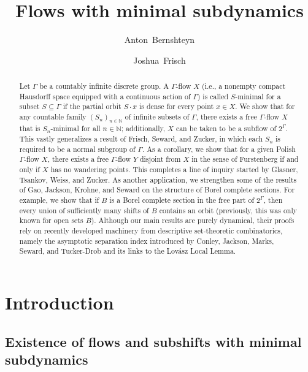 \documentclass[11pt,reqno,psamsfonts]{amsart}
\title{\sffamily Flows with minimal subdynamics}
\date{}
\author{Anton~Bernshteyn}
\author{Joshua~Frisch}
\theoremstyle{bfnote}
\theoremstyle{definition}
\theoremstyle{remark}
\newcommand{\0}{\varnothing}
\newcommand{\G}{\Gamma}
\newcommand{\N}{\mathbb{N}}
\numberwithin{equation}{section}
\begin{document}

\maketitle

\begin{abstract}
    Let $\G$ be a countably infinite discrete group. A $\G$-flow $X$ (i.e., a nonempty compact Hausdorff space equipped with a continuous action of $\G$) is called {$S$-minimal} for a subset $S \subseteq \G$
    if the partial orbit $S \cdot x$ is dense for every point
    $x \in X$. We show that for any countable family $(S_n)_{n \in \N}$ of infinite subsets of $\G$, there exists a free $\G$-flow $X$ that is $S_n$-minimal for all $n \in \N$; additionally, $X$ can be taken to be a subflow of $2^\G$. This vastly generalizes a result of Frisch, Seward, and Zucker,
    in which each $S_n$ is required to be a normal subgroup of $\G$. As a corollary, we show that for a given Polish $\G$-flow $X$, there exists a free $\G$-flow $Y$ disjoint from $X$ in the sense of Furstenberg if and only if $X$ has no wandering points. This completes a line of inquiry started by Glasner, Tsankov, Weiss, and Zucker. 
    As another application, we strengthen some of the results of Gao, Jackson, Krohne, and Seward on the structure of Borel complete sections. For example, we show that if $B$ is a Borel complete section in the free part of $2^\G$, then every union of sufficiently many shifts of $B$ contains an orbit (previously, this was only known for open sets $B$). Although our main results are purely dynamical, their proofs rely on recently developed machinery from descriptive set-theoretic combinatorics, namely the 
    asymptotic separation index introduced by Conley, Jackson, Marks, Seward, and Tucker-Drob and its links to the Lov\'asz Local Lemma.
\end{abstract}

\section{Introduction}\label{sec:intro}

    \subsection{Existence of flows and subshifts with minimal subdynamics}
\end{document}
